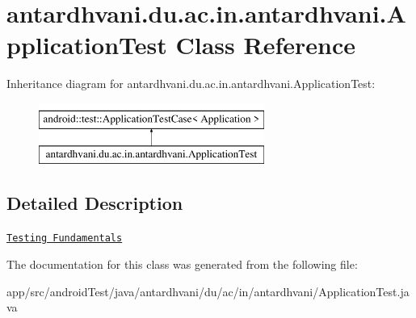 \hypertarget{classantardhvani_1_1du_1_1ac_1_1in_1_1antardhvani_1_1_application_test}{}\section{antardhvani.\+du.\+ac.\+in.\+antardhvani.\+Application\+Test Class Reference}
\label{classantardhvani_1_1du_1_1ac_1_1in_1_1antardhvani_1_1_application_test}
Inheritance diagram for antardhvani.\+du.\+ac.\+in.\+antardhvani.\+Application\+Test\+:\begin{figure}[H]
\begin{center}
\leavevmode
\includegraphics[height=2.000000cm]{classantardhvani_1_1du_1_1ac_1_1in_1_1antardhvani_1_1_application_test}
\end{center}
\end{figure}


\subsection{Detailed Description}
\href{http://d.android.com/tools/testing/testing_android.html}{\tt Testing Fundamentals} 

The documentation for this class was generated from the following file\+:\begin{DoxyCompactItemize}
\item 
app/src/android\+Test/java/antardhvani/du/ac/in/antardhvani/Application\+Test.\+java\end{DoxyCompactItemize}
